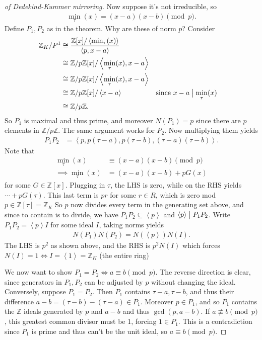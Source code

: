 \begin{proof}[of Dedekind-Kummer mirroring]
Now suppose it's not irreducible, so
\begin{align*}
\min_\tau(x) = (x-a)(x-b) \pmod p
.\end{align*}
Define \(P_1, P_2\) as in the theorem. Why are these of norm \(p\)?
Consider
\begin{align*}
{\mathbb{Z}}_K/P^1 
&\cong { {\mathbb{Z}}[x] / \left\langle{ \min_\tau(x) }\right\rangle \over \left\langle{ p, x-a }\right\rangle } \\
&\cong {\mathbb{Z}}/p{\mathbb{Z}}[x] / \left\langle{ \min_\tau(x), x-a}\right\rangle \\
&\cong {\mathbb{Z}}/p{\mathbb{Z}}[x] / \left\langle{ \min_\tau(x), x-a}\right\rangle \\
&\cong {\mathbb{Z}}/p{\mathbb{Z}}[x] / \left\langle{ x-a}\right\rangle && \text{since } x-a \bigm|\min_\tau(x)\\
&\cong {\mathbb{Z}}/p{\mathbb{Z}}
.\end{align*}
So \(P_1\) is maximal and thus prime, and moreover \(N(P_1) = p\) since
there are \(p\) elements in \({\mathbb{Z}}/p{\mathbb{Z}}\). The same
argument works for \(P_2\). Now multiplying them yields
\begin{align*}
P_1 P_2 
&= \left\langle{ p, p(\tau - a), p (\tau - b), (\tau -a)(\tau -b) }\right\rangle
.\end{align*}
Note that
\begin{align*}
\min_\tau(x) &\equiv (x-a)(x-b) \pmod p \\
\implies
\min_\tau(x) &= (x-a)(x-b) + pG(x)
\end{align*}
for some \(G\in {\mathbb{Z}}[x]\). Plugging in \(\tau\), the LHS is
zero, while on the RHS yields \(\cdots + pG(\tau)\). This last term is
\(pr\) for some \(r\in R\), which is zero mod
\(p \in {\mathbb{Z}}[\tau] = {\mathbb{Z}}_K\) So \(p\) now divides every
term in the generating set above, and since to contain is to divide, we
have \(P_1 P_2 \subseteq \left\langle{ p }\right\rangle\) and
\(\left\langle{ p }\right\rangle \bigm|P_1 P_2\). Write
\(P_1 P_2 = \left\langle{ p }\right\rangle I\) for some ideal \(I\),
taking norms yields
\begin{align*}
N(P_1) N(P_2) = N( \left\langle{ p }\right\rangle) N(I) 
.\end{align*}
The LHS is \(p^2\) as shown above, and the RHS is \(p^2 N(I)\) which
forces
\(N(I) = 1 \iff I = \left\langle{ 1 }\right\rangle = {\mathbb{Z}}_K\)
(the entire ring)

\hfill\break

We now want to show \(P_1 = P_2 \iff a\equiv b \pmod p\). The reverse
direction is clear, since generators in \(P_1, P_2\) can be adjusted by
\(p\) without changing the ideal. Conversely, suppose \(P_1 = P_2\).
Then \(P_1\) contains \(\tau - a, \tau - b\), and thus their difference
\(a-b = (\tau -b ) - (\tau - a) \in P_1\). Moreover \(p\in P_1\), and so
\(P_1\) contains the \({\mathbb{Z}}\) ideals generated by \(p\) and
\(a-b\) and thus \(\gcd(p, a-b)\). If \(a \not\equiv b\pmod p\), this
greatest common divisor must be 1, forcing \(1\in P_1\). This is a
contradiction since \(P_1\) is prime and thus can't be the unit ideal,
so \(a \equiv b \pmod p\).


\end{proof}
